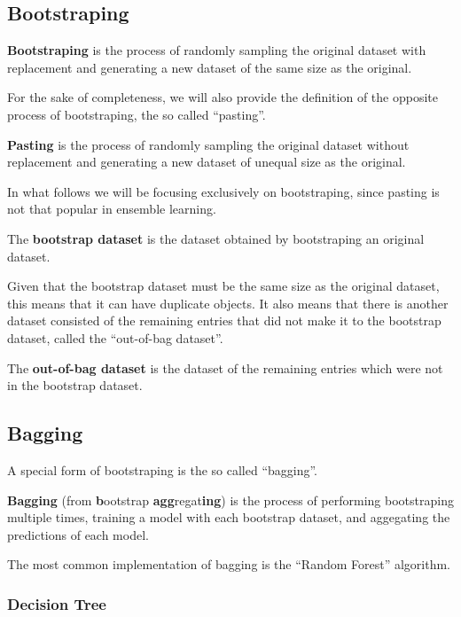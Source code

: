 \subsection{Bootstraping}

\bd[Bootstraping]
\textbf{Bootstraping} is the process of randomly sampling the original dataset with replacement and generating a new
dataset of the same size as the original.
\ed

For the sake of completeness, we will also provide the definition of the opposite process of bootstraping, the so called
``pasting''.

\bd[Pasting]
\textbf{Pasting} is the process of randomly sampling the original dataset without replacement and generating a new
dataset of unequal size as the original.
\ed

In what follows we will be focusing exclusively on bootstraping, since pasting is not that popular in ensemble learning.

The \textbf{bootstrap dataset} is the dataset obtained by bootstraping an original dataset.
\ed

Given that the bootstrap dataset must be the same size as the original dataset, this means that it can have
duplicate objects. It also means that there is another dataset consisted of the remaining entries that did not
make it to the bootstrap dataset, called the ``out-of-bag dataset''.

The \textbf{out-of-bag dataset} is the dataset of the remaining entries which were not in the bootstrap dataset.
\ed


\subsection{Bagging}

A special form of bootstraping is the so called ``bagging''.

\bd[Bagging]
\textbf{Bagging} (from \textbf{b}ootstrap \textbf{agg}regat\textbf{ing}) is the process of performing bootstraping
multiple times, training a model with each bootstrap dataset, and aggegating the predictions of each model.
\ed


The most common implementation of bagging is the ``Random Forest'' algorithm.

\subsubsection{Decision Tree}

